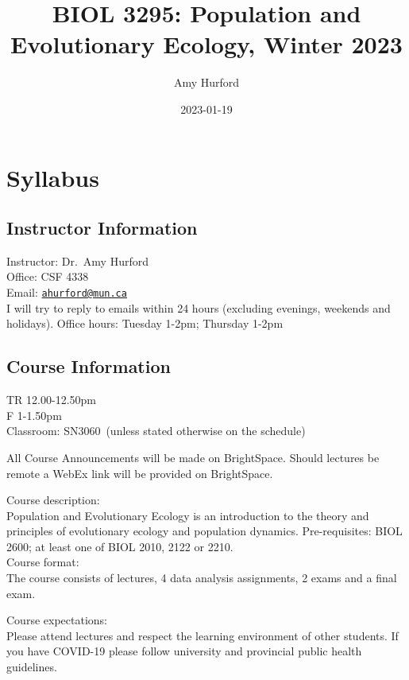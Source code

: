 \documentclass[
]{book}
\title{BIOL 3295: Population and Evolutionary Ecology, Winter 2023}
\author{Amy Hurford}
\date{2023-01-19}
\begin{document}
\maketitle

{
\setcounter{tocdepth}{1}
\tableofcontents
}
\hypertarget{syllabus}{%
\chapter{Syllabus}\label{syllabus}}

\hypertarget{instructor-information}{%
\section{Instructor Information}\label{instructor-information}}

Instructor: Dr.~Amy Hurford\\
Office: CSF 4338\\
Email: \href{mailto:ahurford@mun.ca}{\nolinkurl{ahurford@mun.ca}}\\
I will try to reply to emails within 24 hours (excluding evenings, weekends and holidays).
Office hours: Tuesday 1-2pm; Thursday 1-2pm

\hypertarget{course-information}{%
\section{Course Information}\label{course-information}}

TR 12.00-12.50pm\\
F 1-1.50pm\\
Classroom: SN3060~(unless stated otherwise on the schedule)

All Course Announcements will be made on BrightSpace. Should lectures be remote a WebEx link will be provided on BrightSpace.

Course description:\\
Population and Evolutionary Ecology is an introduction to the theory and principles of evolutionary ecology and population dynamics. Pre-requisites: BIOL 2600; at least one of BIOL 2010, 2122 or 2210.\\

Course format:\\
The course consists of lectures, 4 data analysis assignments, 2 exams and a final exam.~

Course expectations:\\
Please attend lectures and respect the learning environment of other students. If you have COVID-19 please follow university and provincial public health guidelines.\\
\end{document}
